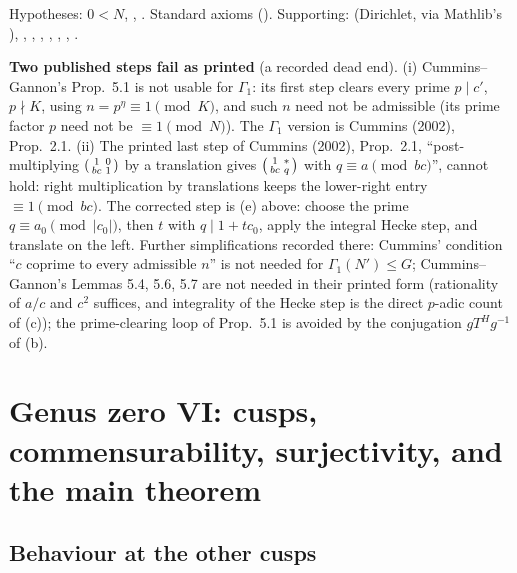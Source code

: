 \begin{status}Hypotheses: $0<N$, , .  Standard
axioms ().  Supporting:  (Dirichlet, via Mathlib's
), , , ,
, , ,
.\end{status}

\begin{warning}
\textbf{Two published steps fail as printed} (a recorded dead end).  (i) Cummins--Gannon's
Prop.~5.1 is not usable for $\Gamma_1$: its first step clears every prime $p\mid c'$, $p\nmid K$, using $n=p^\eta\equiv1\pmod K$, and such $n$
need not be admissible (its prime factor $p$ need not be $\equiv1\pmod N$).  The $\Gamma_1$ version is Cummins (2002), Prop.~2.1.  (ii) The
printed last step of Cummins (2002), Prop.~2.1, ``post-multiplying $\left(\begin{smallmatrix}1&0\\bc&1\end{smallmatrix}\right)$ by a translation gives $\left(\begin{smallmatrix}1&*\\bc&q\end{smallmatrix}\right)$ with
$q\equiv a\pmod{bc}$'', cannot hold: right multiplication by translations keeps the lower-right entry $\equiv1\pmod{bc}$.  The corrected step
is (e) above: choose the prime $q\equiv a_0\pmod{|c_0|}$, then $t$ with $q\mid1+tc_0$, apply the integral Hecke step, and translate on the left.
Further simplifications recorded there: Cummins' condition ``$c$ coprime to every admissible $n$'' is not needed for $\Gamma_1(N')\le G$;
Cummins--Gannon's Lemmas 5.4, 5.6, 5.7 are not needed in their printed form (rationality of $a/c$ and $c^2$ suffices, and integrality of
the Hecke step is the direct $p$-adic count of (c)); the prime-clearing loop of Prop.~5.1 is avoided by the conjugation $gT^Hg^{-1}$ of (b).
\end{warning}

\section[Genus zero VI: cusps, commensurability and the main theorem]{Genus zero VI: cusps, commensurability, surjectivity, and the main theorem}\label{ch19:sec:main}

\subsection{Behaviour at the other cusps}

